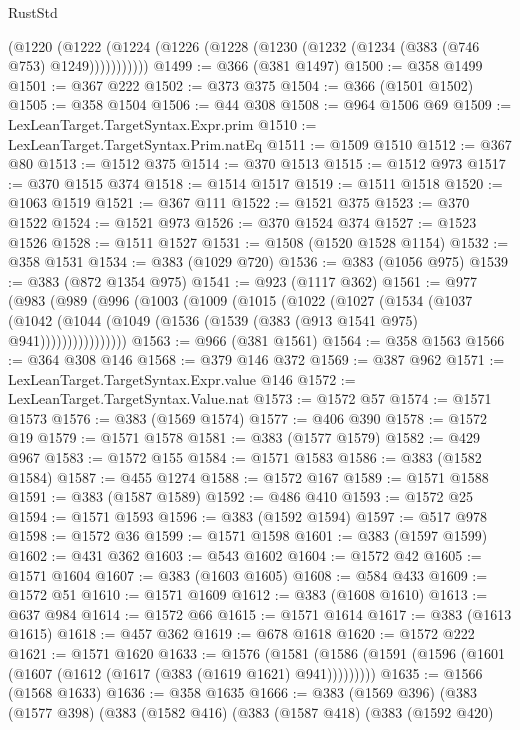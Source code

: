 \begin{lexlean}{RustStd}
\begin{coremodule}
{\begin{coremodule}
{{{{{{{{{{{{{{{{        (@1220 (@1222 (@1224 (@1226 (@1228 (@1230 (@1232 (@1234 (@383 (@746 @753) @1249)))))))))))
@1499 := @366 (@381 @1497)
@1500 := @358 @1499
@1501 := @367 @222
@1502 := @373 @375
@1504 := @366 (@1501 @1502)
@1505 := @358 @1504
@1506 := @44 @308
@1508 := @964 @1506 @69
@1509 := LexLeanTarget.TargetSyntax.Expr.prim
@1510 := LexLeanTarget.TargetSyntax.Prim.natEq
@1511 := @1509 @1510
@1512 := @367 @80
@1513 := @1512 @375
@1514 := @370 @1513
@1515 := @1512 @973
@1517 := @370 @1515 @374
@1518 := @1514 @1517
@1519 := @1511 @1518
@1520 := @1063 @1519
@1521 := @367 @111
@1522 := @1521 @375
@1523 := @370 @1522
@1524 := @1521 @973
@1526 := @370 @1524 @374
@1527 := @1523 @1526
@1528 := @1511 @1527
@1531 := @1508 (@1520 @1528 @1154)
@1532 := @358 @1531
@1534 := @383 (@1029 @720)
@1536 := @383 (@1056 @975)
@1539 := @383 (@872 @1354 @975)
@1541 := @923 (@1117 @362)
@1561 := @977
    (@983
      (@989
        (@996
          (@1003
            (@1009
              (@1015
                (@1022
                  (@1027
                    (@1534
                      (@1037
                        (@1042
                          (@1044 (@1049 (@1536 (@1539 (@383 (@913 @1541 @975) @941))))))))))))))))
@1563 := @966 (@381 @1561)
@1564 := @358 @1563
@1566 := @364 @308 @146
@1568 := @379 @146 @372
@1569 := @387 @962
@1571 := LexLeanTarget.TargetSyntax.Expr.value @146
@1572 := LexLeanTarget.TargetSyntax.Value.nat
@1573 := @1572 @57
@1574 := @1571 @1573
@1576 := @383 (@1569 @1574)
@1577 := @406 @390
@1578 := @1572 @19
@1579 := @1571 @1578
@1581 := @383 (@1577 @1579)
@1582 := @429 @967
@1583 := @1572 @155
@1584 := @1571 @1583
@1586 := @383 (@1582 @1584)
@1587 := @455 @1274
@1588 := @1572 @167
@1589 := @1571 @1588
@1591 := @383 (@1587 @1589)
@1592 := @486 @410
@1593 := @1572 @25
@1594 := @1571 @1593
@1596 := @383 (@1592 @1594)
@1597 := @517 @978
@1598 := @1572 @36
@1599 := @1571 @1598
@1601 := @383 (@1597 @1599)
@1602 := @431 @362
@1603 := @543 @1602
@1604 := @1572 @42
@1605 := @1571 @1604
@1607 := @383 (@1603 @1605)
@1608 := @584 @433
@1609 := @1572 @51
@1610 := @1571 @1609
@1612 := @383 (@1608 @1610)
@1613 := @637 @984
@1614 := @1572 @66
@1615 := @1571 @1614
@1617 := @383 (@1613 @1615)
@1618 := @457 @362
@1619 := @678 @1618
@1620 := @1572 @222
@1621 := @1571 @1620
@1633 := @1576
    (@1581 (@1586 (@1591 (@1596 (@1601 (@1607 (@1612 (@1617 (@383 (@1619 @1621) @941)))))))))
@1635 := @1566 (@1568 @1633)
@1636 := @358 @1635
@1666 := @383
    (@1569 @396)
    (@383
      (@1577 @398)
      (@383
        (@1582 @416)
        (@383
          (@1587 @418)
          (@383
            (@1592 @420)
}}}}}}}}}}}}}}}}
\end{coremodule}}
\end{coremodule}
\end{lexlean}
